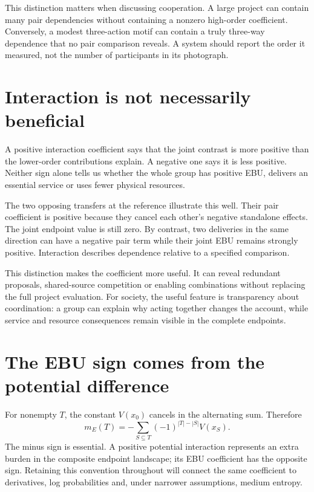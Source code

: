 This distinction matters when discussing cooperation. A large project can contain many pair dependencies without containing a nonzero high-order coefficient. Conversely, a modest three-action motif can contain a truly three-way dependence that no pair comparison reveals. A system should report the order it measured, not the number of participants in its photograph.

\section{Interaction is not necessarily beneficial}
A positive interaction coefficient says that the joint contrast is more positive than the lower-order contributions explain. A negative one says it is less positive. Neither sign alone tells us whether the whole group has positive EBU, delivers an essential service or uses fewer physical resources.

The two opposing transfers at the reference illustrate this well. Their pair coefficient is positive because they cancel each other's negative standalone effects. The joint endpoint value is still zero. By contrast, two deliveries in the same direction can have a negative pair term while their joint EBU remains strongly positive. Interaction describes dependence relative to a specified comparison.

This distinction makes the coefficient more useful. It can reveal redundant proposals, shared-source competition or enabling combinations without replacing the full project evaluation. For society, the useful feature is transparency about coordination: a group can explain why acting together changes the account, while service and resource consequences remain visible in the complete endpoints.

\section{The EBU sign comes from the potential difference}
For nonempty $T$, the constant $V(x_0)$ cancels in the alternating sum. Therefore
\begin{equation}\label{eq:mobius-potential}
 m_E(T)=-\sum_{S\subseteq T}(-1)^{|T|-|S|}V(x_S).
\end{equation}
The minus sign is essential. A positive potential interaction represents an extra burden in the composite endpoint landscape; its EBU coefficient has the opposite sign. Retaining this convention throughout will connect the same coefficient to derivatives, log probabilities and, under narrower assumptions, medium entropy.


